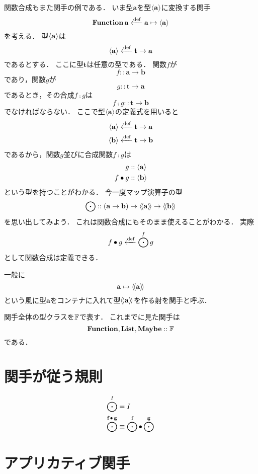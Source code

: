 \documentclass[twocolumn]{jsbook}
\newcommand{\typename}[1]{\mathbf{#1}}
\newcommand{\identity}{\mathnormal{I}}
\begin{document}
関数合成もまた関手の例である．
いま型$\typename{a}$を型$\function{\typename{a}}$に変換する関手$$\functionfunctor\typename{a}\defeq\typename{a}\mapsto\function{\typename{a}}$$を考える．
型$\function{\typename{a}}$は$$\function{\typename{a}}\defeq\typename{t}\rightarrow\typename{a}$$であるとする．
ここに型$\typename{t}$は任意の型である．
関数$f$が$$f::\typename{a}\rightarrow\typename{b}$$であり，関数$g$が$$g::\typename{t}\rightarrow\typename{a}$$であるとき，その合成$f\comp g$は$$f\comp g::\typename{t}\rightarrow\typename{b}$$でなければならない．
ここで型$\function{\typename{a}}$の定義式を用いると
\begin{align*}
\function{\typename{a}}&\defeq\typename{t}\rightarrow\typename{a}\\
\function{\typename{b}}&\defeq\typename{t}\rightarrow\typename{b}
\end{align*}
であるから，関数$g$並びに合成関数$f\comp g$は
\begin{align*}
g&::\function{\typename{a}}\\
f\comp g&::\function{\typename{b}}
\end{align*}
という型を持つことがわかる．
今一度マップ演算子の型$$\mapfunc::(\typename{a}\rightarrow\typename{b})\rightarrow\generalcontainer{\typename{a}}\rightarrow\generalcontainer{\typename{b}}$$を思い出してみよう．
これは関数合成にもそのまま使えることがわかる．
実際$$f\bullet g\xleftarrow{\text{def}}\bigodot^fg$$として関数合成は定義できる．

一般に$$\typename{a}\mapsto\generalcontainer{\typename{a}}$$という風に型$\typename{a}$をコンテナに入れて型$\generalcontainer{\typename{a}}$を作る射を関手と呼ぶ．

関手全体の型クラスを$\mathbb{F}$で表す．
これまでに見た関手は$$\mathop{\mathop{\textbf{Function}}},\mathop{\mathop{\textbf{List}}},\mathop{\mathop{\textbf{Maybe}}}::\mathbb{F}$$である．


\section{関手が従う規則}

\begin{align}
\mapfunc^\identity&=\identity\\
\mapfunc^{\functor{f}\comp\functor{g}}&\equiv\mapfunc^{\functor{f}}\comp\mapfunc^{\functor{g}}
\end{align}

\section{アプリカティブ関手}
\end{document}
